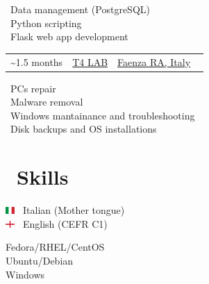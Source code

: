 \documentclass{article}
\makeatletter
\newcommand{\triple}[3]{
    \begin{tabularx}{\textwidth} {@{}>{\raggedright\arraybackslash}X >{\centering\arraybackslash}c >{\raggedleft\arraybackslash}X@{}}
    #1 & #2 & #3
    \end{tabularx}
}
\makeatother
\begin{document}
\begin{paracol}{2}
\begin{tcolorbox}[title=Software Developer Internship]
        \faDatabase \ Data management (PostgreSQL) \\
        \faPython \ Python scripting \\
        \faFlask \ Flask web app development
    \end{tcolorbox}

    \begin{tcolorbox}[title=Computer Technician Internship]
        \triple
            {\faCalendar* 2017 \textasciitilde 1.5 months}
            {\href{https://www.t4lab.it/}{T4 LAB}}
            {\href{https://www.openstreetmap.org/relation/43004}{Faenza RA, Italy} \ \faCity}
        \tcblower

        \faLaptop \ PCs repair \\
        \faShieldVirus \ Malware removal \\
        \faRecycle \ Windows mantainance and troubleshooting \\
        \faHdd \ Disk backups and OS installations
    \end{tcolorbox}

    \switchcolumn

    \section*{\faLightbulb \ Skills}

    \begin{tcolorbox}[title=Languages]
        \includegraphics[width=10pt]{it} \ Italian (Mother tongue) \\
        \includegraphics[width=10pt]{gb-eng} \ English (CEFR C1)
    \end{tcolorbox}

    \begin{tcolorbox}[title=Operating Systems]
        \textcolor[HTML]{EE0000}{\faRedhat} Fedora/RHEL/CentOS \\
        \textcolor[HTML]{E95420}{\faUbuntu} Ubuntu/Debian \\
        \textcolor[HTML]{0078D6}{\faWindows} Windows
    \end{tcolorbox}


\end{paracol}
\end{document}
